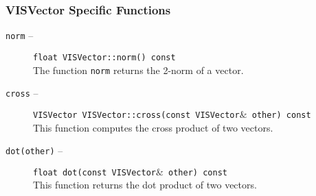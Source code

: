 \subsubsection{VISVector Specific Functions}
\label{ml_vsf}
\begin{description}
\item[{\tt norm} --]
{\tt float VISVector::norm() const}\\
The function {\tt norm} returns the 2-norm of a vector.
\item[{\tt cross} --]
{\tt VISVector VISVector::cross(const VISVector$\&$ other) const}\\
This function computes the cross product of two vectors.
\item[{\tt dot(other)} --]
{\tt float dot(const VISVector$\&$ other) const}\\
This function returns the dot product of two vectors.
\end{description}

